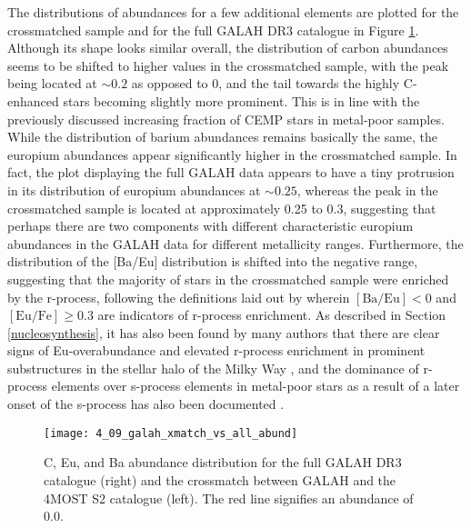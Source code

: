 \documentclass[a4paper,11pt]{article}
\begin{document}
%
The distributions of abundances for a few additional elements are plotted for the crossmatched sample and for the full GALAH DR3 catalogue in Figure \ref{fig:galah_xmatch_abund}. Although its shape looks similar overall, the distribution of carbon abundances seems to be shifted to higher values in the crossmatched sample, with the peak being located at ${\sim}0.2$ as opposed to 0, and the tail towards the highly C-enhanced stars becoming slightly more prominent. This is in line with the previously discussed increasing fraction of CEMP stars in metal-poor samples. While the distribution of barium abundances remains basically the same, the europium abundances appear significantly higher in the crossmatched sample. In fact, the plot displaying the full GALAH data appears to have a tiny protrusion in its distribution of europium abundances at ${\sim}0.25$, whereas the peak in the crossmatched sample is located at approximately 0.25 to 0.3, suggesting that perhaps there are two components with different characteristic europium abundances in the GALAH data for different metallicity ranges. Furthermore, the distribution of the [Ba/Eu] distribution is shifted into the negative range, suggesting that the majority of stars in the crossmatched sample were enriched by the r-process, following the definitions laid out by \citet{beers05} wherein $\mathrm{[Ba/Eu]}<0$ and $\mathrm{[Eu/Fe]}\geq0.3$ are indicators of r-process enrichment. As described in Section \ref{nucleosynthesis}, it has also been found by many authors that there are clear signs of Eu-overabundance and elevated r-process enrichment in prominent substructures in the stellar halo of the Milky Way \citep[see, e.g.,][]{matsuno21,aguado21,roederer18}, and the dominance of r-process elements over s-process elements in metal-poor stars as a result of a later onset of the s-process has also been documented \citep[see, e.g.,][]{simmerer04,kappeler11,battistini16}.
%
\begin{figure}
 \centering
 \texttt{[image: 4\_09\_galah\_xmatch\_vs\_all\_abund]}
 \caption[C, Eu, and Ba abundances for GALAH and crossmatch]{C, Eu, and Ba abundance distribution for the full GALAH DR3 catalogue (right) and the crossmatch between GALAH and the 4MOST S2 catalogue (left). The red line signifies an abundance of 0.0.}
 \label{fig:galah_xmatch_abund}
\end{figure}\\ \\
%
\end{document}
